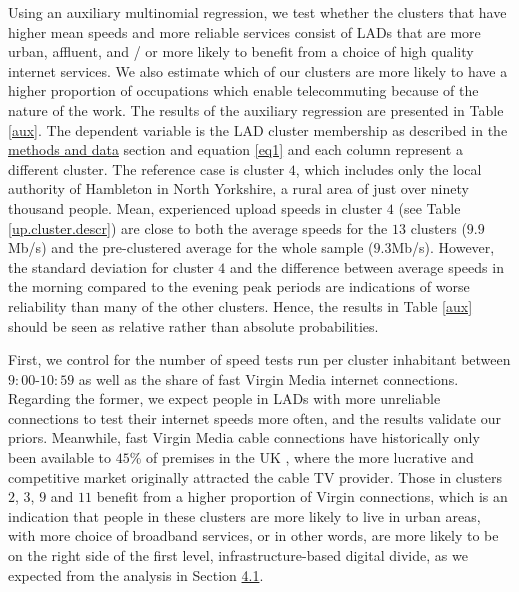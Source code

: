 \documentclass[Royal,times,sageh]{sagej}
\begin{document}
Using an auxiliary multinomial regression, we test whether the clusters
that have higher mean speeds and more reliable services consist of LADs
that are more urban, affluent, and / or more likely to benefit from a
choice of high quality internet services. We also estimate which of our
clusters are more likely to have a higher proportion of occupations
which enable telecommuting because of the nature of the work. The
results of the auxiliary regression are presented in Table \ref{aux}.
The dependent variable is the LAD cluster membership as described in the
\protect\hyperlink{sec:3}{methods and data} section and equation
\ref{eq1} and each column represent a different cluster. The reference
case is cluster \(4\), which includes only the local authority of
Hambleton in North Yorkshire, a rural area of just over ninety thousand
people. Mean, experienced upload speeds in cluster \(4\) (see Table
\ref{up.cluster.descr}) are close to both the average speeds for the
\(13\) clusters (\(9.9\)Mb/s) and the pre-clustered average for the
whole sample (\(9.3\)Mb/s). However, the standard deviation for cluster
\(4\) and the difference between average speeds in the morning compared
to the evening peak periods are indications of worse reliability than
many of the other clusters. Hence, the results in Table \ref{aux} should
be seen as relative rather than absolute probabilities.

First, we control for the number of speed tests run per cluster
inhabitant between \(9:00\)-\(10:59\) as well as the share of fast
Virgin Media internet connections. Regarding the former, we expect
people in LADs with more unreliable connections to test their internet
speeds more often, and the results validate our priors. Meanwhile, fast
Virgin Media cable connections have historically only been available to
\(45\)\% of premises in the UK \citep{ofcom2016}, where the more
lucrative and competitive market originally attracted the cable TV
provider. Those in clusters \(2\), \(3\), \(9\) and \(11\) benefit from
a higher proportion of Virgin connections, which is an indication that
people in these clusters are more likely to live in urban areas, with
more choice of broadband services, or in other words, are more likely to
be on the right side of the first level, infrastructure-based digital
divide, as we expected from the analysis in Section
\protect\hyperlink{sec:4.1}{4.1}.
\end{document}
